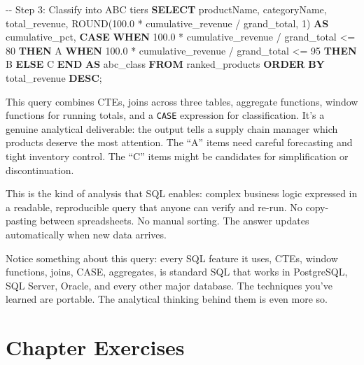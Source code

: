 \documentclass[
  letterpaper,
  DIV=11,
  numbers=noendperiod]{scrreprt}
\newenvironment{Shaded}{\begin{snugshade}}{\end{snugshade}}
\newcommand{\CommentTok}[1]{\textcolor[rgb]{0.37,0.37,0.37}{#1}}
\newcommand{\ControlFlowTok}[1]{\textcolor[rgb]{0.00,0.23,0.31}{\textbf{#1}}}
\newcommand{\DecValTok}[1]{\textcolor[rgb]{0.68,0.00,0.00}{#1}}
\newcommand{\FloatTok}[1]{\textcolor[rgb]{0.68,0.00,0.00}{#1}}
\newcommand{\FunctionTok}[1]{\textcolor[rgb]{0.28,0.35,0.67}{#1}}
\newcommand{\KeywordTok}[1]{\textcolor[rgb]{0.00,0.23,0.31}{\textbf{#1}}}
\newcommand{\NormalTok}[1]{\textcolor[rgb]{0.00,0.23,0.31}{#1}}
\newcommand{\OperatorTok}[1]{\textcolor[rgb]{0.37,0.37,0.37}{#1}}
\newcommand{\StringTok}[1]{\textcolor[rgb]{0.13,0.47,0.30}{#1}}
\begin{document}
\begin{codelisting}
\begin{Shaded}
\begin{Highlighting}[]
\CommentTok{{-}{-} Step 3: Classify into ABC tiers}
\KeywordTok{SELECT}
\NormalTok{    productName,}
\NormalTok{    categoryName,}
\NormalTok{    total\_revenue,}
    \FunctionTok{ROUND}\NormalTok{(}\FloatTok{100.0} \OperatorTok{*}\NormalTok{ cumulative\_revenue }\OperatorTok{/}\NormalTok{ grand\_total, }\DecValTok{1}\NormalTok{) }\KeywordTok{AS}\NormalTok{ cumulative\_pct,}
    \ControlFlowTok{CASE}
        \ControlFlowTok{WHEN} \FloatTok{100.0} \OperatorTok{*}\NormalTok{ cumulative\_revenue }\OperatorTok{/}\NormalTok{ grand\_total }\OperatorTok{\textless{}=} \DecValTok{80} \ControlFlowTok{THEN} \StringTok{\textquotesingle{}A\textquotesingle{}}
        \ControlFlowTok{WHEN} \FloatTok{100.0} \OperatorTok{*}\NormalTok{ cumulative\_revenue }\OperatorTok{/}\NormalTok{ grand\_total }\OperatorTok{\textless{}=} \DecValTok{95} \ControlFlowTok{THEN} \StringTok{\textquotesingle{}B\textquotesingle{}}
        \ControlFlowTok{ELSE} \StringTok{\textquotesingle{}C\textquotesingle{}}
    \ControlFlowTok{END} \KeywordTok{AS}\NormalTok{ abc\_class}
\KeywordTok{FROM}\NormalTok{ ranked\_products}
\KeywordTok{ORDER} \KeywordTok{BY}\NormalTok{ total\_revenue }\KeywordTok{DESC}\NormalTok{;}
\end{Highlighting}
\end{Shaded}

\end{codelisting}

This query combines CTEs, joins across three tables, aggregate
functions, window functions for running totals, and a \texttt{CASE}
expression for classification. It's a genuine analytical deliverable:
the output tells a supply chain manager which products deserve the most
attention. The ``A'' items need careful forecasting and tight inventory
control. The ``C'' items might be candidates for simplification or
discontinuation.

This is the kind of analysis that SQL enables: complex business logic
expressed in a readable, reproducible query that anyone can verify and
re-run. No copy-pasting between spreadsheets. No manual sorting. The
answer updates automatically when new data arrives.

Notice something about this query: every SQL feature it uses, CTEs,
window functions, joins, CASE, aggregates, is standard SQL that works in
PostgreSQL, SQL Server, Oracle, and every other major database. The
techniques you've learned are portable. The analytical thinking behind
them is even more so.

\section{Chapter Exercises}\label{chapter-exercises-3}
\end{document}
